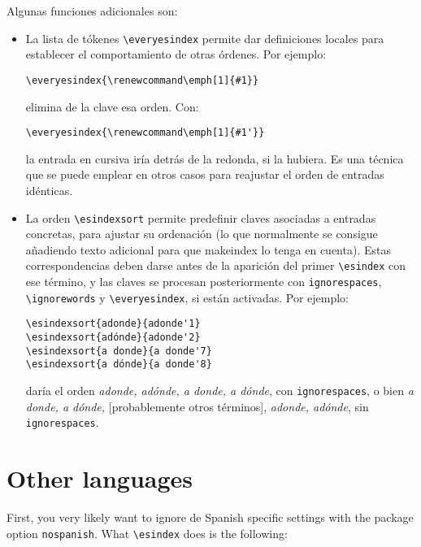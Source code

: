 \documentclass{article}
\begin{document}
Algunas funciones adicionales son:
\begin{itemize}
\item La lista de tókenes \verb|\everyesindex| permite dar definiciones
locales para establecer el comportamiento de otras órdenes. Por
ejemplo:
\begin{verbatim}
\everyesindex{\renewcommand\emph[1]{#1}}
\end{verbatim}
elimina de la clave esa orden. Con:
\begin{verbatim}
\everyesindex{\renewcommand\emph[1]{#1'}}
\end{verbatim}
la entrada en cursiva iría detrás de la redonda, si la hubiera. Es una
técnica que se puede emplear en otros casos para reajustar el orden de
entradas idénticas.

\item La orden \verb|\esindexsort| permite predefinir claves asociadas
a entradas concretas, para ajustar su ordenación (lo que normalmente se
consigue añadiendo texto adicional para que makeindex lo tenga en
cuenta). Estas correspondencias deben darse antes de la aparición del
primer \verb|\esindex| con ese término, y las claves se procesan
posteriormente con \verb|ignorespaces|, \verb|\ignorewords| y
\verb|\everyesindex|, si están activadas. Por ejemplo:
\begin{verbatim}
\esindexsort{adonde}{adonde'1}
\esindexsort{adónde}{adonde'2}
\esindexsort{a donde}{a donde'7}
\esindexsort{a dónde}{a donde'8}
\end{verbatim}
daría el orden \emph{adonde, adónde, a donde, a dónde}, con
\verb|ignorespaces|, o bien \emph{a donde, a dónde,} [probablemente
otros términos], \emph{adonde, adónde}, sin \verb|ignorespaces|.
\end{itemize}

\section{Other languages}

First, you very likely want to ignore de Spanish specific settings with
the package option \verb|nospanish|. What \verb|\esindex| does is the
following:
\end{document}
